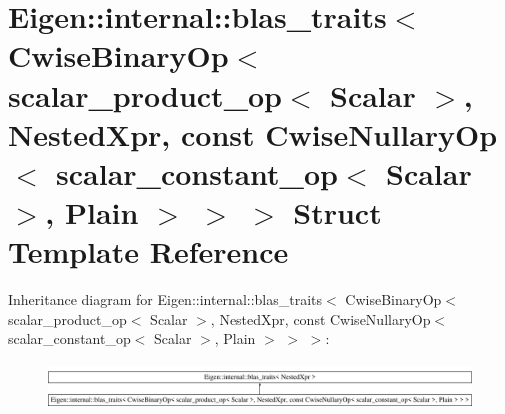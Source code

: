 \hypertarget{struct_eigen_1_1internal_1_1blas__traits_3_01_cwise_binary_op_3_01scalar__product__op_3_01_scala947462575c60123595df86e5556ae031}{}\section{Eigen\+::internal\+::blas\+\_\+traits$<$ Cwise\+Binary\+Op$<$ scalar\+\_\+product\+\_\+op$<$ Scalar $>$, Nested\+Xpr, const Cwise\+Nullary\+Op$<$ scalar\+\_\+constant\+\_\+op$<$ Scalar $>$, Plain $>$ $>$ $>$ Struct Template Reference}
\label{struct_eigen_1_1internal_1_1blas__traits_3_01_cwise_binary_op_3_01scalar__product__op_3_01_scala947462575c60123595df86e5556ae031}
Inheritance diagram for Eigen\+::internal\+::blas\+\_\+traits$<$ Cwise\+Binary\+Op$<$ scalar\+\_\+product\+\_\+op$<$ Scalar $>$, Nested\+Xpr, const Cwise\+Nullary\+Op$<$ scalar\+\_\+constant\+\_\+op$<$ Scalar $>$, Plain $>$ $>$ $>$\+:\begin{figure}[H]
\begin{center}
\leavevmode
\includegraphics[height=1.240310cm]{struct_eigen_1_1internal_1_1blas__traits_3_01_cwise_binary_op_3_01scalar__product__op_3_01_scala947462575c60123595df86e5556ae031}
\end{center}
\end{figure}
